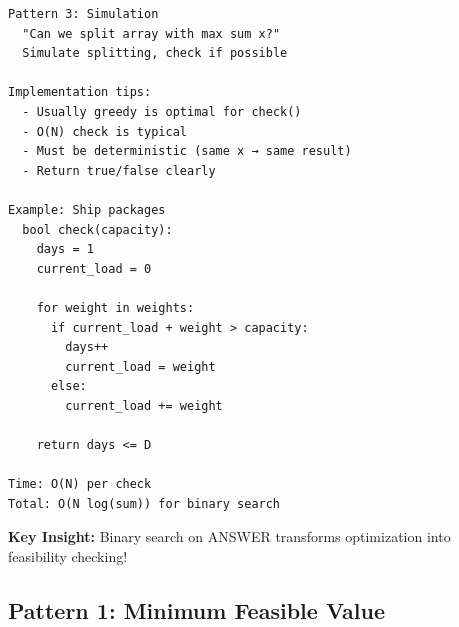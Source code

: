 \documentclass[11pt,a4paper,oneside]{book}
\begin{document}
\begin{tcolorbox}[
    enhanced,breakable,
    colback=white,
    colframe=deepblue,
    boxrule=1.5pt,
    arc=3mm,
    title=\textbf{The Search Space Transformation}
]
\begin{verbatim}
Pattern 3: Simulation
  "Can we split array with max sum x?"
  Simulate splitting, check if possible

Implementation tips:
  - Usually greedy is optimal for check()
  - O(N) check is typical
  - Must be deterministic (same x → same result)
  - Return true/false clearly

Example: Ship packages
  bool check(capacity):
    days = 1
    current_load = 0
    
    for weight in weights:
      if current_load + weight > capacity:
        days++
        current_load = weight
      else:
        current_load += weight
    
    return days <= D

Time: O(N) per check
Total: O(N log(sum)) for binary search
\end{verbatim}

\textbf{Key Insight:}
Binary search on ANSWER transforms optimization into feasibility checking!
\end{tcolorbox}

\subsection{Pattern 1: Minimum Feasible Value}
\end{document}
